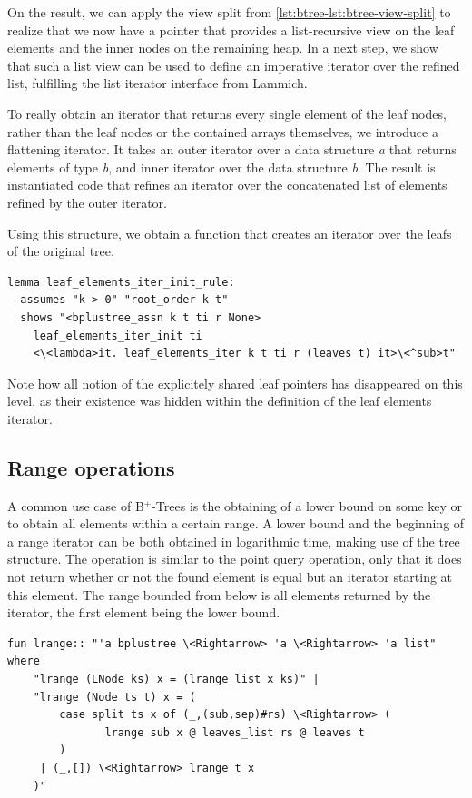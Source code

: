 \documentclass[a4paper,UKenglish,cleveref, autoref, thm-restate]{lipics-v2021}
\newcommand{\btrees}{B$^+$-Trees}
\begin{document}
On the result, we can apply the view split from \autoref{lst:btree-lst:btree-view-split}
to realize that we now have a pointer that provides a list-recursive
view on the leaf elements and the inner nodes on the remaining heap.
In a next step, we show that such a list view can be used
to define an imperative iterator over the refined list,
fulfilling the list iterator interface from Lammich. \cite{DBLP:conf/itp/Lammich19}

To really obtain an iterator that returns every single element of the
leaf nodes, rather than the leaf nodes or the contained arrays themselves,
we introduce a flattening iterator.
It takes an outer iterator over a data structure \textit{a} that returns elements of type \textit{b},
and inner iterator over the data structure \textit{b}.
The result is instantiated code that refines an iterator
over the concatenated list of elements refined by the outer iterator.

Using this structure, we obtain a function that creates an iterator
over the leafs of the original tree.
\begin{lstlisting}[mathescape=true, language=Isabelle,label=lst:btree-view-split]
lemma leaf_elements_iter_init_rule:
  assumes "k > 0" "root_order k t"
  shows "<bplustree_assn k t ti r None>
    leaf_elements_iter_init ti
    <\<lambda>it. leaf_elements_iter k t ti r (leaves t) it>\<^sub>t"
\end{lstlisting}

Note how all notion of the explicitely shared leaf pointers
has disappeared on this level, as their existence was hidden within the definition
of the leaf elements iterator.

\subsection{Range operations}
\label{sec:imperative_range}

A common use case of \btrees
is the obtaining of a lower bound on some key
or to obtain  all elements within a certain range. \cite{DBLP:journals/ftdb/Graefe11}
A lower bound and the beginning of a range iterator
can be both obtained in logarithmic time, making use of the tree structure.
The operation is similar to the point query operation,
only that it does not return whether or not the
found element is equal but an iterator starting at this element.
The range bounded from below is all elements returned by the iterator,
the first element being the lower bound.

\begin{lstlisting}[mathescape=true, language=Isabelle,label=lst:btree-lrange]
fun lrange:: "'a bplustree \<Rightarrow> 'a \<Rightarrow> 'a list" where
    "lrange (LNode ks) x = (lrange_list x ks)" |
    "lrange (Node ts t) x = (
        case split ts x of (_,(sub,sep)#rs) \<Rightarrow> (
               lrange sub x @ leaves_list rs @ leaves t
        )
     | (_,[]) \<Rightarrow> lrange t x
    )"
\end{lstlisting}
  
\end{document}
